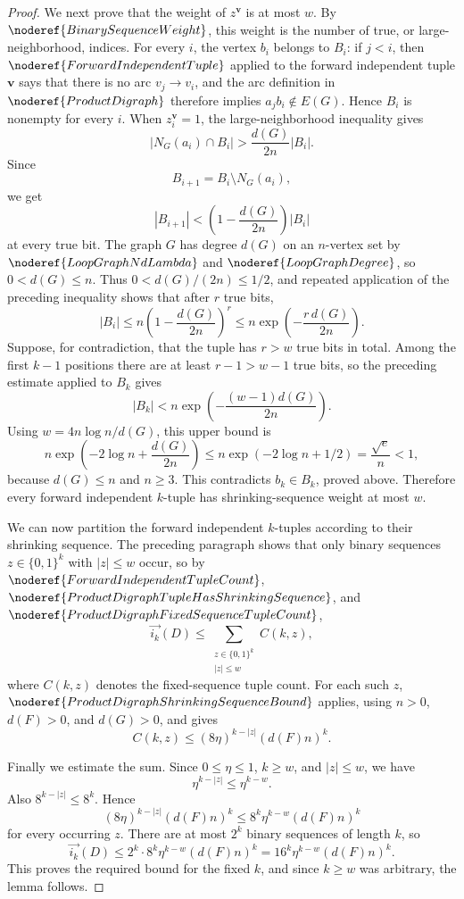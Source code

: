 \begin{proof}
We next prove that the weight of \(z^{\mathbf v}\) is at most \(w\). By \(\noderef{BinarySequenceWeight}\), this weight is the number of true, or large-neighborhood, indices. For every \(i\), the vertex \(b_i\) belongs to \(B_i\): if \(j<i\), then \(\noderef{ForwardIndependentTuple}\) applied to the forward independent tuple \(\mathbf v\) says that there is no arc \(v_j\to v_i\), and the arc definition in \(\noderef{ProductDigraph}\) therefore implies \(a_jb_i\notin E(G)\). Hence \(B_i\) is nonempty for every \(i\). When \(z^{\mathbf v}_i=1\), the large-neighborhood inequality gives
\[
  |N_G(a_i)\cap B_i|>\frac{d(G)}{2n}|B_i|.
\]
Since
\[
  B_{i+1}=B_i\setminus N_G(a_i),
\]
we get
\[
  |B_{i+1}|<\left(1-\frac{d(G)}{2n}\right)|B_i|
\]
at every true bit. The graph \(G\) has degree \(d(G)\) on an \(n\)-vertex set by \(\noderef{LoopGraphNdLambda}\) and \(\noderef{LoopGraphDegree}\), so \(0<d(G)\le n\). Thus \(0<d(G)/(2n)\le1/2\), and repeated application of the preceding inequality shows that after \(r\) true bits,
\[
  |B_i|\le n\left(1-\frac{d(G)}{2n}\right)^r
  \le n\exp\left(-\frac{r\,d(G)}{2n}\right).
\]
Suppose, for contradiction, that the tuple has \(r>w\) true bits in total. Among the first \(k-1\) positions there are at least \(r-1>w-1\) true bits, so the preceding estimate applied to \(B_k\) gives
\[
  |B_k|
  < n\exp\left(-\frac{(w-1)d(G)}{2n}\right).
\]
Using \(w=4n\log n/d(G)\), this upper bound is
\[
  n\exp\left(-2\log n+\frac{d(G)}{2n}\right)
  \le n\exp(-2\log n+1/2)
  =\frac{\sqrt e}{n}<1,
\]
because \(d(G)\le n\) and \(n\ge3\). This contradicts \(b_k\in B_k\), proved above. Therefore every forward independent \(k\)-tuple has shrinking-sequence weight at most \(w\).

We can now partition the forward independent \(k\)-tuples according to their shrinking sequence. The preceding paragraph shows that only binary sequences \(z\in\{0,1\}^k\) with \(|z|\le w\) occur, so by \(\noderef{ForwardIndependentTupleCount}\), \(\noderef{ProductDigraphTupleHasShrinkingSequence}\), and \(\noderef{ProductDigraphFixedSequenceTupleCount}\),
\[
  \overrightarrow{i_k}(D)
  \le \sum_{\substack{z\in\{0,1\}^k\\ |z|\le w}}
      C(k,z),
\]
where \(C(k,z)\) denotes the fixed-sequence tuple count. For each such \(z\), \(\noderef{ProductDigraphShrinkingSequenceBound}\) applies, using \(n>0\), \(d(F)>0\), and \(d(G)>0\), and gives
\[
  C(k,z)\le (8\eta)^{k-|z|}(d(F)n)^k.
\]

Finally we estimate the sum. Since \(0\le\eta\le1\), \(k\ge w\), and \(|z|\le w\), we have
\[
  \eta^{k-|z|}\le \eta^{k-w}.
\]
Also \(8^{k-|z|}\le 8^k\). Hence
\[
  (8\eta)^{k-|z|}(d(F)n)^k
  \le 8^k\eta^{k-w}(d(F)n)^k
\]
for every occurring \(z\). There are at most \(2^k\) binary sequences of length \(k\), so
\[
  \overrightarrow{i_k}(D)
  \le 2^k\cdot 8^k\eta^{k-w}(d(F)n)^k
  =16^k\eta^{k-w}(d(F)n)^k.
\]
This proves the required bound for the fixed \(k\), and since \(k\ge w\) was arbitrary, the lemma follows.
\end{proof}
